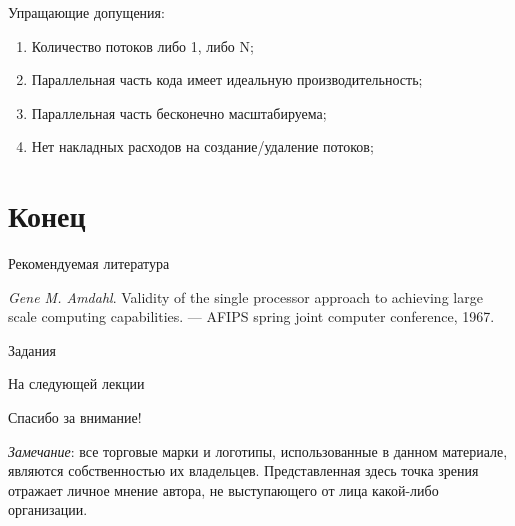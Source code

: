 \begin{frame}
Упращающие допущения:
\begin{enumerate}
    \item Количество потоков либо 1, либо N;
    \item Параллельная часть кода имеет идеальную производительность;
    \item Параллельная часть бесконечно масштабируема;
    \item Нет накладных расходов на создание/удаление потоков;
\end{enumerate}
\end{frame}

\section*{Конец}

\begin{frame}[allowframebreaks]{Рекомендуемая литература}
\begin{thebibliography}{99}
    \bibitem{} \textit{Gene M. Amdahl}. Validity of the single processor
    approach to achieving large scale computing capabilities. --- AFIPS spring
    joint computer conference, 1967.
\end{thebibliography}
\end{frame}

\begin{frame}{Задания}
\end{frame}

\begin{frame}{На следующей лекции}
\end{frame}

\begin{frame}

{\huge{Спасибо за внимание!}\par}

\vfill

\tiny{\textit{Замечание}: все торговые марки и логотипы, использованные в данном материале, являются собственностью их владельцев. Представленная здесь точка зрения отражает личное мнение автора, не выступающего от лица какой-либо организации.}

\end{frame}


